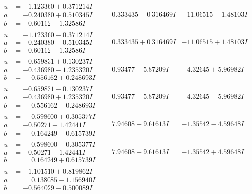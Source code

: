 \documentclass[1p]{elsarticle_modified}
\theoremstyle{definition}
\begin{document}
$$\begin{array}{c|c|c}
\begin{aligned}
u &= -1.123360 + 0.371214 I \\
a &= -0.240380 + 0.510345 I \\
b &= -0.60112 + 1.32586 I\end{aligned}
 & \phantom{-}0.333435 - 0.316469 I & -11.06515 - 1.48103 I \\ \hline\begin{aligned}
u &= -1.123360 - 0.371214 I \\
a &= -0.240380 - 0.510345 I \\
b &= -0.60112 - 1.32586 I\end{aligned}
 & \phantom{-}0.333435 + 0.316469 I & -11.06515 + 1.48103 I \\ \hline\begin{aligned}
u &= -0.659831 + 0.130237 I \\
a &= -0.436980 - 1.235320 I \\
b &= \phantom{-}0.556162 + 0.248693 I\end{aligned}
 & \phantom{-}0.93477 - 5.87209 I & -4.32645 + 5.96982 I \\ \hline\begin{aligned}
u &= -0.659831 - 0.130237 I \\
a &= -0.436980 + 1.235320 I \\
b &= \phantom{-}0.556162 - 0.248693 I\end{aligned}
 & \phantom{-}0.93477 + 5.87209 I & -4.32645 - 5.96982 I \\ \hline\begin{aligned}
u &= \phantom{-}0.598600 + 0.305377 I \\
a &= -0.50271 + 1.42441 I \\
b &= \phantom{-}0.164249 - 0.615739 I\end{aligned}
 & \phantom{-}7.94608 + 9.61613 I & -1.35542 - 4.59648 I \\ \hline\begin{aligned}
u &= \phantom{-}0.598600 - 0.305377 I \\
a &= -0.50271 - 1.42441 I \\
b &= \phantom{-}0.164249 + 0.615739 I\end{aligned}
 & \phantom{-}7.94608 - 9.61613 I & -1.35542 + 4.59648 I \\ \hline\begin{aligned}
u &= -1.101510 + 0.819862 I \\
a &= \phantom{-}0.138085 - 1.156940 I \\
b &= -0.564029 - 0.500089 I\end{aligned}

\end{array}$$
\end{document}
